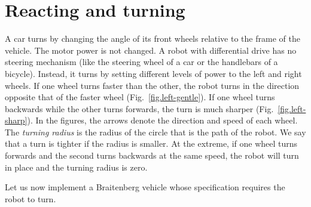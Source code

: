 \section{Reacting and turning}\label{s.turning}

A car turns by changing the angle of its front wheels relative to the frame of the vehicle. The motor power is not changed. A robot with differential drive has no steering mechanism (like the steering wheel of a car or the handlebars of a bicycle). Instead, it turns by setting different levels of power to the left and right wheels. If one wheel turns faster than the other, the robot turns in the direction opposite that of the faster wheel  (Fig.~\ref{fig.left-gentle}). If one wheel turns backwards while the other turns forwards, the turn is much sharper (Fig.~\ref{fig.left-sharp}). In the figures, the arrows denote the direction and speed of each wheel. The \emph{turning radius} is the radius of the circle that is the path of the robot. We say that a turn is tighter if the radius is smaller. At the extreme, if one wheel turns forwards and the second turns backwards at the same speed, the robot will turn in place and the turning radius is zero.

\begin{figure}
\subfigures
\begin{minipage}{\textwidth}
\hspace{\fill}
\end{minipage}
\end{figure}

Let us now implement a Braitenberg vehicle whose specification requires the robot to turn.


